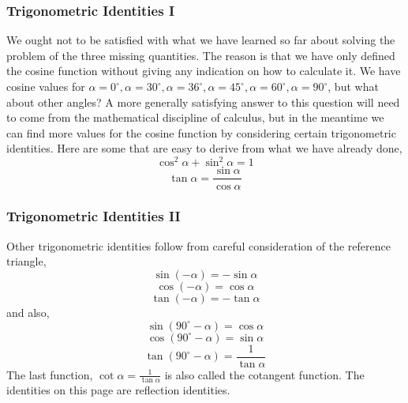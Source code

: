\documentclass[xcolor=dvipsnames]{beamer}
\begin{document}
\begin{frame}
  \frametitle{Trigonometric Identities I}
  We ought not to be satisfied with what we have learned so far about
  solving the problem of the three missing quantities. The reason is
  that we have only defined the cosine function without giving any
  indication on how to calculate it. We have cosine values for
  $\alpha=0^{\circ},\alpha=30^{\circ},\alpha=36^{\circ},\alpha=45^{\circ},\alpha=60^{\circ},\alpha=90^{\circ}$,
  but what about other angles? A more generally satisfying answer to
  this question will need to come from the mathematical discipline of
  calculus, but in the meantime we can find more values for the cosine
  function by considering certain trigonometric identities. Here are
  some that are easy to derive from what we have already done,
  \begin{equation}
    \label{eq:aicheeho}
    \cos^{2}\alpha+\sin^{2}\alpha=1
  \end{equation}
  \begin{equation}
    \label{eq:ieshahko}
    \tan\alpha=\frac{\sin\alpha}{\cos\alpha}
  \end{equation}
\end{frame}

\begin{frame}
  \frametitle{Trigonometric Identities II}
Other trigonometric identities follow from careful consideration of
the reference triangle,
\begin{equation}
  \label{eq:iegaexah}
  \sin(-\alpha)=-\sin\alpha
\end{equation}
\begin{equation}
  \label{eq:gaijohra}
  \cos(-\alpha)=\cos\alpha
\end{equation}
\begin{equation}
  \label{eq:doajeigh}
  \tan(-\alpha)=-\tan\alpha
\end{equation}
and also,
\begin{equation}
  \label{eq:dieteipa}
  \sin(90^{\circ}-\alpha)=\cos\alpha
\end{equation}
\begin{equation}
  \label{eq:oepoodoh}
  \cos(90^{\circ}-\alpha)=\sin\alpha
\end{equation}
\begin{equation}
  \label{eq:aiwatong}
  \tan(90^{\circ}-\alpha)=\frac{1}{\tan\alpha}
\end{equation}
The last function, $\cot\alpha=\frac{1}{\tan\alpha}$ is also called
the cotangent function. The identities on this page are reflection
identities.
\end{frame}
\end{document}
